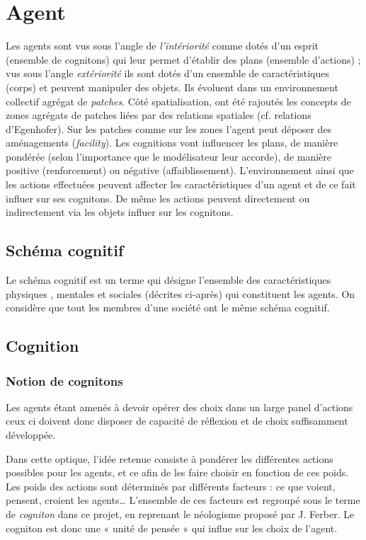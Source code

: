 \documentclass[a4paper,oneside,12 pt]{article}
\begin{document}
\section{Agent}
Les agents sont vus sous l'angle de \textit{l'intériorité }comme dotés d'un esprit (ensemble de cognitons) qui leur permet d'établir des plans (ensemble d'actions) ;  vus sous l'angle \textit{extériorité} ils sont dotés d'un ensemble de caractéristiques (corps) et peuvent manipuler des objets. Ils évoluent dans un environnement collectif agrégat de \textit{patches}. Côté spatialisation, ont été rajoutés les concepts de zones agrégats de patches liées par des relations spatiales (cf. relations d'Egenhofer). Sur les patches comme sur les zones l'agent peut déposer des aménagements (\textit{facility}).
Les cognitions vont influencer les plans, de manière pondérée (selon l'importance que le modélisateur leur accorde), de manière positive (renforcement) ou négative (affaiblissement).
L'environnement ainsi que les actions effectuées peuvent affecter les caractéristiques d'un agent et de ce fait influer sur ses cognitons.
De même les actions peuvent directement ou indirectement via les objets influer sur les cognitons.

\subsection{Schéma cognitif}
	Le schéma cognitif est un terme qui désigne l'ensemble des caractéristiques physiques , mentales et sociales (décrites ci-après) qui constituent les agents. On considère que tout les membres d'une société ont le même schéma cognitif.
	  
\subsection{Cognition}

\subsubsection{Notion de cognitons}

	Les agents étant amenés à devoir opérer des choix dans un large panel d'actions ceux ci doivent donc disposer de capacité de réflexion et de choix suffisamment développée.
	
	Dans cette optique, l'idée retenue consiste à pondérer les différentes actions possibles pour les agents, et  ce afin de les faire choisir en fonction de ces poids. 
	Les poids des actions sont déterminés par différents facteurs : ce que voient, pensent, croient les agents… L'ensemble de ces facteurs est regroupé sous le terme de \textit{cogniton} dans ce projet, en reprenant le néologisme proposé par J. Ferber. Le cogniton est donc une « unité de pensée » qui influe sur les choix de l'agent. 	
	
\end{document}
